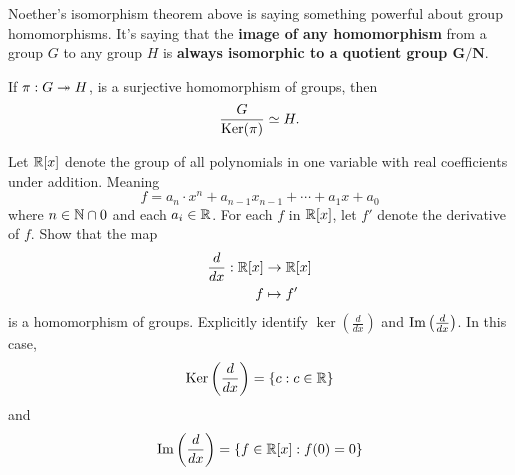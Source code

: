 \documentclass{ximera}
\begin{document}
Noether's isomorphism theorem above is saying something powerful about
group homomorphisms. It's saying that the \textbf{image of any
  homomorphism} from a group $G$ to any group $H$ is \textbf{always
  isomorphic to a quotient group $\boldsymbol{G/N}$}.


\begin{corollary}
  If $\pi:G\twoheadrightarrow H$, is a surjective homomorphism of groups, then
  \[
  \frac{G}{\mathop{\mathrm{Ker}}\nolimits(\pi)} \simeq H.
  \]
\end{corollary}


\begin{example}
  Let $\mathbb R[x]$ denote the group of all polynomials in one variable with
  real coefficients under addition. Meaning
  \[
  f = a_n\cdot x^{n} + a_{n-1}x_{n-1} + \cdots + a_1x + a_0
  \]
  where $n\in\mathbb N\cap{0}$ and each $a_i\in\mathbb R$.  For each $f$ in $\mathbb R[x]$,
  let $f'$ denote the derivative of $f$. Show that the map
  \begin{align*}
    \frac{d}{dx}:\mathbb R[x]&\to\mathbb R[x]\\
    f  &\mapsto f'
  \end{align*}
  is a homomorphism of groups. Explicitly identify
  $\ker\left(\frac{d}{dx}\right)$ and $\operatorname{Im}\left(\frac{d}{dx}\right)$.
  In this case,
  \[
  \mathop{\mathrm{Ker}}\nolimits\left(\frac{d}{dx}\right) = \{c:c\in \mathbb R\}
  \]
  and
  \[
  \operatorname{Im}\left(\frac{d}{dx}\right) = \{f\in\mathbb R[x]:f(0)=0\}
  \]
  
\end{example}
\end{document}
